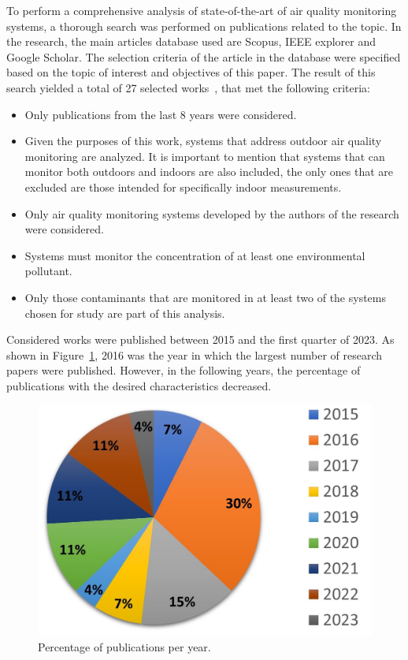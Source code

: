 \documentclass[10pt]{../style_src/imeko_acta}
\begin{document}
To perform a comprehensive analysis of state-of-the-art of air quality monitoring systems, a thorough search was performed on publications related to the topic. In the research, the main articles database used are Scopus, IEEE explorer and  Google Scholar. The selection criteria of the article in the database were specified based on the topic of interest and objectives of this paper. The result of this search yielded a total of 27 selected works~\cite{JABBAR2022100540, liu2016low,wivou2016air,yang2015smart,gunawan2018design, purkayastha2021iot, kadir2021cloud, truong2021design, spandonidis2020compact,kumar2017air,sun2016development,de2020iot,PALOMEQUEMANGUT2022135948, s22020502, 8663367, chaudhari2017iot, zakaria2018wireless, deshmukh2016low, kaur2016air, pal2023remote, al2015monitoring, brienza2015low, phala2016air, kumar2020design, ahmed2017real, khedo2017low, fioccola2016polluino}, that met the following criteria:
\begin{itemize}
    \item Only publications from the last 8 years were considered.
    \item Given the purposes of this work, systems that address outdoor air quality monitoring are analyzed. It is important to mention that systems that can monitor both outdoors and indoors are also included, the only ones that are excluded are those intended for specifically indoor measurements.
    \item Only air quality monitoring systems developed by the authors of the research were considered. 
    \item Systems must monitor the concentration of at least one environmental pollutant.
    \item Only those contaminants that are monitored in at least two of the systems chosen for study are part of this analysis.
\end{itemize}

Considered works were published between 2015 and the first quarter of 2023. As shown in Figure~\ref{publications_year}, 2016 was the year in which the largest number of research papers were published. However,  in the following years, the percentage of publications with the desired characteristics decreased.

\begin{figure}[!tb]
	\centering
	\includegraphics[width=0.7\linewidth]{number_papers_year.jpg}
	\caption{Percentage of publications per year.
        \label{publications_year}}
\end{figure}
\end{document}

